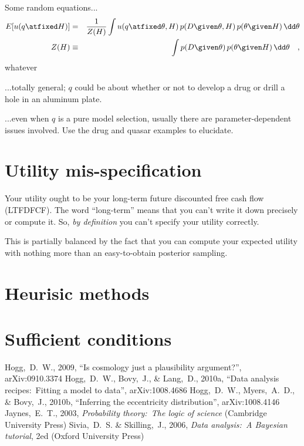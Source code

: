 \documentclass[12pt,twoside]{article}
\begin{document}
Some random equations...
\begin{eqnarray}
E[u(q\atfixed H)] &=& \frac{1}{Z(H)}\int u(q\atfixed\theta, H)\,p(D\given\theta,H)\,p(\theta\given H)\,\dd\theta
\\
Z(H) &\equiv& \int p(D\given\theta)\,p(\theta\given H)\,\dd\theta
\quad ,
\end{eqnarray}
whatever

...totally general; $q$ could be about whether or not to develop a drug or drill a hole in an aluminum plate.

...even when $q$ is a pure model selection, usually there are parameter-dependent issues involved.  Use the drug and quasar examples to elucidate.

\section{Utility mis-specification}

Your utility ought to be your long-term future discounted free cash flow (LTFDFCF).
The word ``long-term'' means that you can't write it down precisely or compute it.
So, \emph{by definition} you can't specify your utility correctly.

This is partially balanced by the fact that you can compute your expected utility with
  nothing more than an easy-to-obtain posterior sampling.

\section{Heurisic methods}

\section{Sufficient conditions}

\clearpage
{}\theendnotes

\clearpage
\begin{thebibliography}{}\raggedright
{}
  Hogg,~D.~W., 2009,
  ``Is cosmology just a plausibility argument?'', arXiv:0910.3374
  Hogg,~D.~W., Bovy,~J., \& Lang,~D., 2010a,
  ``Data analysis recipes:\ Fitting a model to data'', arXiv:1008.4686
  Hogg,~D.~W., Myers,~A.~D., \& Bovy,~J., 2010b,
  ``Inferring the eccentricity distribution'', arXiv:1008.4146
  Jaynes,~E.~T., 2003,
  \textit{Probability theory:\ The logic of science} (Cambridge University Press)
  Sivia,~D.~S. \& Skilling,~J., 2006,
  \textit{Data analysis:\ A Bayesian tutorial}, 2ed (Oxford University Press)
\end{thebibliography}
\end{document}
